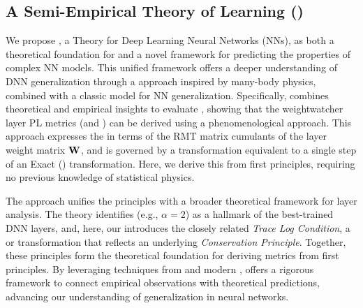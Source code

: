 \subsection{A Semi-Empirical Theory of Learning (\SETOL)}

We propose \SETOL, a \SemiEmpirical Theory for Deep Learning Neural Networks (NNs),
as both a theoretical foundation for \HTSR \Phenomenology
and a novel framework for predicting the properties of complex NN models.
This unified framework offers a deeper understanding of DNN generalization
through a \SemiEmpirical approach inspired by many-body physics,
combined with a classic \STATMECH model for NN generalization.
Specifically, \SETOL combines theoretical and empirical insights to evaluate \ModelQuality,
showing that the weightwatcher layer \HTSR PL metrics (\ALPHA and \ALPHAHAT)
can be derived using a phenomenological \EffectiveHamiltonian approach.
This approach expresses the \HTSR \LayerQuality in terms of the RMT matrix cumulants
of the layer weight matrix ${\mathbf{W}}$,
and is governed by a \ScaleInvariant transformation equivalent
to a single step of an Exact \RenormalizationGroup (\ERG) transformation.
Here, we derive this from first principles, requiring no previous knowledge of statistical physics.

The \SETOL approach unifies the \HTSR principles with
a broader theoretical framework for layer analysis.
The \HTSR theory identifies \Universality (e.g., $\alpha=2$) as a hallmark of the best-trained DNN layers,
and, here, our \SETOL introduces the closely related \emph{Trace Log Condition}, a \ScaleInvariant or
\VolumePreserving transformation that reflects an underlying \emph{Conservation Principle}.
Together, these principles form the theoretical foundation for deriving \HTSR \LayerQuality metrics from first principles.
By leveraging techniques from \STATMECH and modern \RMT, \SETOL offers a rigorous framework
to connect empirical observations with theoretical predictions, advancing our understanding of generalization
in neural networks.

